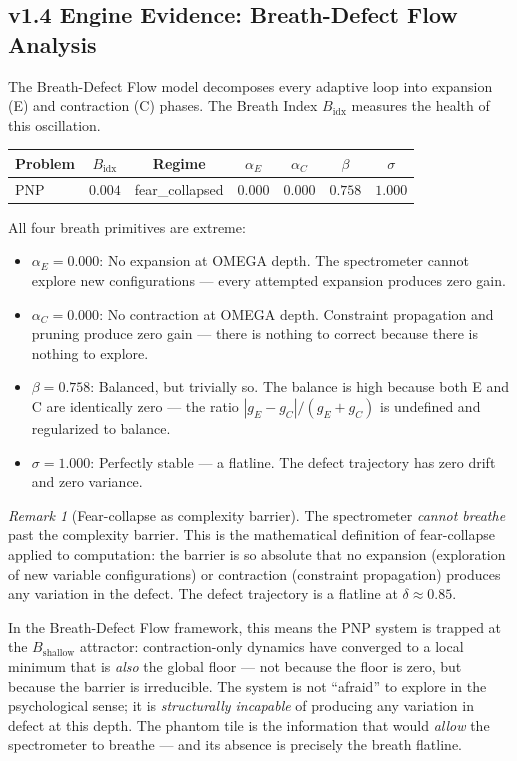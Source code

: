 \documentclass[11pt]{article}
\theoremstyle{definition}
\theoremstyle{remark}
\newtheorem{remark}[theorem]{Remark}
\begin{document}
\subsection{v1.4 Engine Evidence: Breath-Defect Flow Analysis}
\label{sec:breath-pnp}

The Breath-Defect Flow model decomposes every adaptive loop into expansion
(E) and contraction (C) phases.  The Breath Index $B_{\mathrm{idx}}$ measures
the health of this oscillation.

\begin{center}
\begin{tabular}{@{}lcccccc@{}}
\toprule
\textbf{Problem} & $B_{\mathrm{idx}}$ & \textbf{Regime} & $\alpha_E$ & $\alpha_C$ & $\beta$ & $\sigma$ \\
\midrule
PNP & $0.004$ & fear\_collapsed & $0.000$ & $0.000$ & $0.758$ & $1.000$ \\
\bottomrule
\end{tabular}
\end{center}

\noindent
All four breath primitives are extreme:
\begin{itemize}[nosep]
  \item $\alpha_E = 0.000$: No expansion at OMEGA depth.  The spectrometer
    cannot explore new configurations --- every attempted expansion produces
    zero gain.
  \item $\alpha_C = 0.000$: No contraction at OMEGA depth.  Constraint
    propagation and pruning produce zero gain --- there is nothing to correct
    because there is nothing to explore.
  \item $\beta = 0.758$: Balanced, but trivially so.  The balance is high
    because both E and C are identically zero --- the ratio $|g_E - g_C|/(g_E + g_C)$
    is undefined and regularized to balance.
  \item $\sigma = 1.000$: Perfectly stable --- a flatline.  The defect
    trajectory has zero drift and zero variance.
\end{itemize}

\begin{remark}[Fear-collapse as complexity barrier]
\label{rem:fear-collapse-pnp}
The spectrometer \emph{cannot breathe} past the complexity barrier.  This is
the mathematical definition of fear-collapse applied to computation: the
barrier is so absolute that no expansion (exploration of new variable
configurations) or contraction (constraint propagation) produces any variation
in the defect.  The defect trajectory is a flatline at $\delta \approx 0.85$.

In the Breath-Defect Flow framework, this means the PNP system is trapped at
the $B_{\mathrm{shallow}}$ attractor: contraction-only dynamics have converged
to a local minimum that is \emph{also} the global floor --- not because the
floor is zero, but because the barrier is irreducible.  The system is not
``afraid'' to explore in the psychological sense; it is \emph{structurally
incapable} of producing any variation in defect at this depth.  The phantom
tile is the information that would \emph{allow} the spectrometer to breathe ---
and its absence is precisely the breath flatline.
\end{remark}
\end{document}
